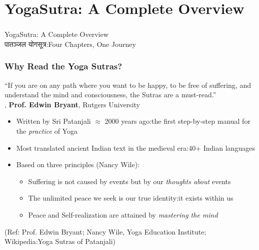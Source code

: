 \section[Overview]{YogaSutra: A Complete Overview}

\begin{frame}[fragile]\frametitle{}
\begin{center}
{\Large YogaSutra: A Complete Overview}\\
{\normalsize पातञ्जल योगसूत्र:Four Chapters, One Journey}
\end{center}
\end{frame}

\begin{frame}[fragile]\frametitle{Why Read the Yoga Sutras?}

\begin{center}
{\large ``If you are on any path where you want to be happy, to be free of suffering, and understand the mind and consciousness, the Sutras are a must-read.''}\\
, \textbf{Prof. Edwin Bryant}, Rutgers University
\end{center}

\vspace{3mm}
\begin{itemize}
\item Written by Sri Patanjali $\approx$ 2000 years ago:the first step-by-step manual for the \emph{practice} of Yoga
\item Most translated ancient Indian text in the medieval era:40+ Indian languages
\item Based on three principles (Nancy Wile):
    \begin{itemize}
    \item Suffering is not caused by events but by our \emph{thoughts about} events
    \item The unlimited peace we seek is our true identity:it exists within us
    \item Peace and Self-realization are attained by \emph{mastering the mind}
    \end{itemize}
\end{itemize}

\tiny{(Ref: Prof. Edwin Bryant; Nancy Wile, Yoga Education Institute; Wikipedia:Yoga Sutras of Patanjali)}

\end{frame}

